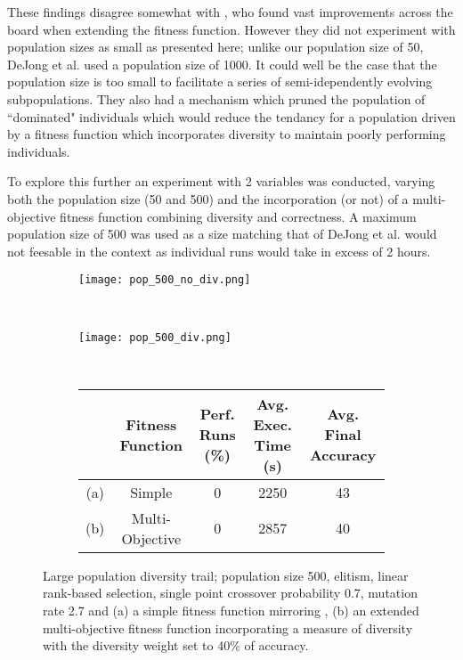 These findings disagree somewhat with \cite{deJong:2001:RBP:2955239.2955241},
who found vast improvements across the board when extending the fitness
function. However they did not experiment with population sizes as small
as presented here; unlike our population size of 50, DeJong et al. used
a population size of 1000. It could well be the case that
the population size is too small to facilitate a series of semi-idependently
evolving subpopulations. They also had a mechanism which pruned the population
of ``dominated" individuals which would reduce the tendancy for a population
driven by a fitness function which incorporates diversity to maintain poorly
performing individuals.

To explore this further an experiment with 2 variables was conducted, varying
both the population size (50 and 500) and the incorporation (or not) of a
multi-objective fitness function combining diversity and correctness. A maximum
population size of 500 was used as a
size matching that of DeJong et al. would not feesable in the context as individual
runs would take in excess of 2 hours.

\begin{figure}
	\centering
	\begin{subfigure}[ht]{0.49\textwidth}
		\texttt{[image: pop\_500\_no\_div.png]}
		\caption{}
		\label{fig:500_no_div}
		\vspace{1em}
	\end{subfigure}
	~
	\begin{subfigure}[ht]{0.49\textwidth}
		\texttt{[image: pop\_500\_div.png]}
		\caption{}
		\label{fig:500_div}
		\vspace{1em}
	\end{subfigure}
	~
	\begin{subfigure}[ht]{\textwidth}
		\centering
		\begin{tabular}{ccccc}
			\toprule
			& \bfseries{Fitness Function} &
			\bfseries{Perf. Runs (\%)} &
			\bfseries{Avg. Exec. Time (s)} & \bfseries{Avg. Final Accuracy}\\
			\midrule
			(a) & Simple & 0 & 2250 & 43\\
			(b) & Multi-Objective & 0 & 2857 & 40\\
			\bottomrule
		\end{tabular}
	\end{subfigure}

	\caption[Large population diversity trail]{Large population diversity trail;
		population size 500, elitism, linear rank-based selection, single point
		crossover probability 0.7, mutation rate 2.7 and
		(a) a simple fitness function mirroring \cite{10.1007/3-540-63173-9_61},
		(b) an extended multi-objective fitness function incorporating a measure
		of diversity with the diversity weight set to 40\% of accuracy.}
	\label{fig:500}
\end{figure}

